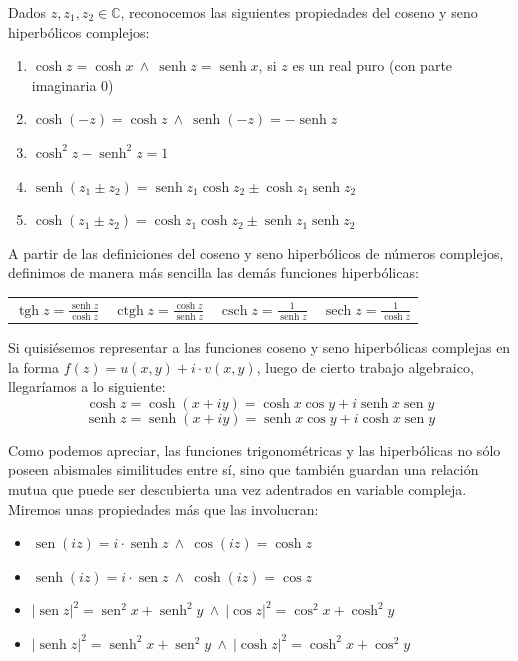 \documentclass[12pt]{article}
\theoremstyle{definition}
\theoremstyle{theorem}
\DeclareMathOperator{\sen}{sen}
\DeclareMathOperator{\senh}{senh}
\DeclareMathOperator{\tgh}{tgh}
\DeclareMathOperator{\ctgh}{ctgh}
\DeclareMathOperator{\sech}{sech}
\DeclareMathOperator{\csch}{csch}
\begin{document}
Dados $z, z_1, z_2 \in \mathbb{C}$, reconocemos las siguientes propiedades del coseno y seno hiperb\'olicos complejos:
\begin{enumerate}
	\item $\cosh z = \cosh x\ \land\ \senh z = \senh x$, si $z$ es un real puro (con parte imaginaria 0)
	\item $\cosh (-z) = \cosh z\ \land\ \senh(-z) = -\senh z$
	\item $\cosh^2 z - \senh^2 z = 1$
	\item $\senh(z_1 \pm z_2) = \senh z_1 \cosh z_2 \pm \cosh z_1 \senh z_2$
	\item $\cosh(z_1 \pm z_2) = \cosh z_1 \cosh z_2 \pm \senh z_1 \senh z_2$
\end{enumerate}

A partir de las definiciones del coseno y seno hiperb\'olicos de n\'umeros complejos, definimos de manera m\'as sencilla las dem\'as funciones hiperb\'olicas:

\begin{center}
	\begin{tabular}{cccc}
	$\displaystyle \tgh z = \frac{\senh z}{\cosh z} $ & $\displaystyle \ctgh z = \frac{\cosh z}{\senh z} $ & $\displaystyle \csch z = \frac{1}{\senh z} $ & $\displaystyle \sech z = \frac{1}{\cosh z} $ \\
	\end{tabular}
\end{center}

Si quisi\'esemos representar a las funciones coseno y seno hiperb\'olicas complejas en la forma $f(z) = u(x, y) + i\cdot v(x, y)$, luego de cierto trabajo algebraico, llegar\'iamos a lo siguiente:
$$\cosh z = \cosh(x + iy) = \cosh x \cos y + i\senh x \sen y$$
$$\senh z = \senh(x + iy) = \senh x \cos y + i\cosh x \sen y$$

Como podemos apreciar, las funciones trigonom\'etricas y las hiperb\'olicas no s\'olo poseen abismales similitudes entre s\'i, sino que tambi\'en guardan una relaci\'on mutua que puede ser descubierta una vez adentrados en variable compleja. Miremos unas propiedades m\'as que las involucran:
\begin{itemize}
	\item $\sen(iz) = i\cdot \senh z\ \land\ \cos(iz) = \cosh z$
	\item $\senh(iz) = i\cdot \sen z\ \land\ \cosh(iz) = \cos z$
	\item $|\sen z|^2 = \sen^2 x + \senh^2 y \ \land\ |\cos z|^2 = \cos^2 x + \cosh^2 y$
	\item $|\senh z|^2 = \senh^2 x + \sen^2 y\ \land\ |\cosh z|^2 = \cosh^2 x + \cos^2 y$
\end{itemize}
\ \\
\end{document}

